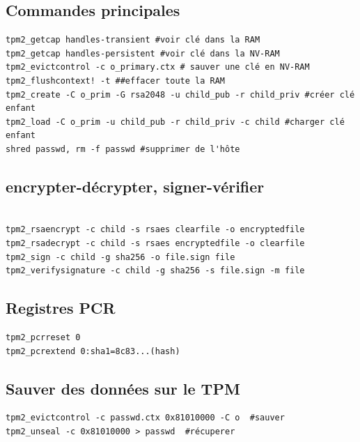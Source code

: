\documentclass[resume]{subfiles}
\begin{document}
\subsection{Commandes principales}
\begin{lstlisting}[style=bash]
tpm2_getcap handles-transient #voir clé dans la RAM
tpm2_getcap handles-persistent #voir clé dans la NV-RAM
tpm2_evictcontrol -c o_primary.ctx # sauver une clé en NV-RAM
tpm2_flushcontext! -t ##effacer toute la RAM
tpm2_create -C o_prim -G rsa2048 -u child_pub -r child_priv #créer clé enfant
tpm2_load -C o_prim -u child_pub -r child_priv -c child #charger clé enfant
shred passwd, rm -f passwd #supprimer de l'hôte

\end{lstlisting}

\subsection{encrypter-décrypter, signer-vérifier}
\begin{lstlisting}[style=bash]

tpm2_rsaencrypt -c child -s rsaes clearfile -o encryptedfile
tpm2_rsadecrypt -c child -s rsaes encryptedfile -o clearfile
tpm2_sign -c child -g sha256 -o file.sign file
tpm2_verifysignature -c child -g sha256 -s file.sign -m file
\end{lstlisting}

\subsection{Registres PCR}

\begin{lstlisting}[style=bash]
tpm2_pcrreset 0
tpm2_pcrextend 0:sha1=8c83...(hash)
\end{lstlisting}

\subsection{Sauver des données sur le TPM}

\begin{lstlisting}[style=bash]
tpm2_evictcontrol -c passwd.ctx 0x81010000 -C o  #sauver
tpm2_unseal -c 0x81010000 > passwd  #récuperer
\end{lstlisting}
\end{document}
